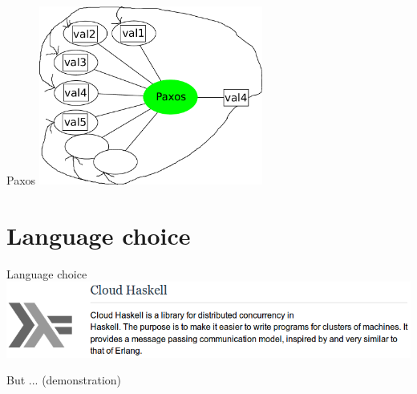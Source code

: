 \documentclass[14pt]{beamer}
\begin{document}
\begin{frame}{Paxos}
    \includegraphics[height=5.87cm]{images/paxos3.pdf}
\end{frame}

\section{Language choice}

\begin{frame}{Language choice}
    \pause
    \includegraphics[width=\textwidth]{images/cloudhaskell.png}
    \pause
    \vspace{1cm}

    But ... (demonstration)
\end{frame}
\end{document}
